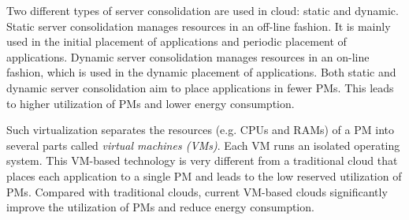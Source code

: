  Two different types of
server consolidation are used in cloud: static and dynamic. Static server consolidation manages resources in an off-line fashion. It is mainly 
used in the initial placement of applications and periodic placement of applications. Dynamic server consolidation manages resources in 
an on-line fashion, which is used in the dynamic placement of applications. Both static and dynamic server consolidation aim to place
applications in fewer PMs. This leads to higher utilization of PMs and lower energy consumption.



Such virtualization separates the resources (e.g. CPUs and RAMs) of a PM into several parts called \emph{virtual machines (VMs)}. 
Each VM runs an isolated operating system. This VM-based technology is very different from a 
traditional cloud that places each application to a single PM and leads to the low reserved utilization of PMs. 
Compared with traditional clouds, current VM-based clouds significantly improve the utilization of PMs and reduce energy consumption.



